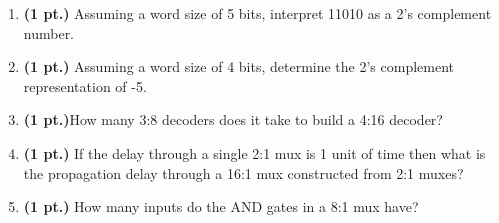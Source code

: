 \documentclass{article}
\begin{document}
\begin{enumerate}

\item {\bf (1 pt.)} Assuming a word size of 5 bits, interpret 11010 as a 2's complement
number.

\item {\bf (1 pt.)} Assuming a word size of 4 bits, determine the 2's complement
representation of -5.

\item {\bf (1 pt.)}How many 3:8 decoders does it take to build a 4:16 decoder?


\item {\bf (1 pt.)} If the delay through a single 2:1 mux is 1 unit of time then
what is the propagation delay through a 16:1 mux constructed from 2:1 muxes?

\item {\bf (1 pt.)} How many inputs do the AND gates in a 8:1 mux have?


\end{enumerate}
\end{document}

